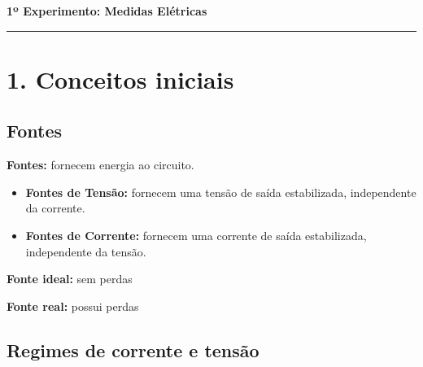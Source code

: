 \documentclass[a4paper,12pt]{article}
\begin{document}
\begin{center}
    {\LARGE \textbf{1º Experimento: Medidas Elétricas}}
\end{center}

\hrule
\vspace{1em}

\section*{1. Conceitos iniciais}

\subsection*{Fontes}
\textbf{Fontes:} fornecem energia ao circuito.

\begin{itemize}[leftmargin=2em]
    \item \textbf{Fontes de Tensão:}
    \textcolor{quadrovermelho}{fornecem uma tensão de saída estabilizada, independente da corrente.}

    \item \textbf{Fontes de Corrente:}
    \textcolor{quadrovermelho}{fornecem uma corrente de saída estabilizada, independente da tensão.}
\end{itemize}

\textbf{Fonte ideal:} \textcolor{quadroazul}{sem perdas}

\textbf{Fonte real:} \textcolor{quadroazul}{possui perdas}

\subsection*{Regimes de corrente e tensão}
\end{document}
